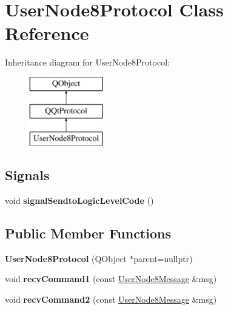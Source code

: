 \hypertarget{class_user_node8_protocol}{}\section{User\+Node8\+Protocol Class Reference}
\label{class_user_node8_protocol}
Inheritance diagram for User\+Node8\+Protocol\+:\begin{figure}[H]
\begin{center}
\leavevmode
\includegraphics[height=3.000000cm]{class_user_node8_protocol}
\end{center}
\end{figure}
\subsection*{Signals}
\begin{DoxyCompactItemize}
\item 
\mbox{\label{class_user_node8_protocol_a7227a435bff20e6f3798928f30ff8fdb}} 
void {\bfseries signal\+Sendto\+Logic\+Level\+Code} ()
\end{DoxyCompactItemize}
\subsection*{Public Member Functions}
\begin{DoxyCompactItemize}
\item 
\mbox{\label{class_user_node8_protocol_aea1aca5b6ce3ab682531eb178cc60cb5}} 
{\bfseries User\+Node8\+Protocol} (Q\+Object $\ast$parent=nullptr)
\item 
\mbox{\label{class_user_node8_protocol_affc82cc874f5d415bb87ba66f6933b66}} 
void {\bfseries recv\+Command1} (const \mbox{\hyperlink{class_user_node8_message}{User\+Node8\+Message}} \&msg)
\item 
\mbox{\label{class_user_node8_protocol_a315f025f749a4e53598f9235182242de}} 
void {\bfseries recv\+Command2} (const \mbox{\hyperlink{class_user_node8_message}{User\+Node8\+Message}} \&msg)
\end{DoxyCompactItemize}
